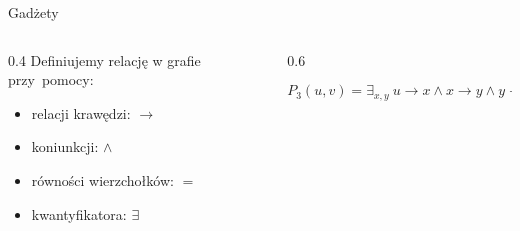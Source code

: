 \begin{frame}{Gadżety}
\begin{columns}
    \begin{column}{0.4\textwidth}
    Definiujemy relację w grafie przy~pomocy:
        \begin{itemize}
            \item relacji krawędzi: \(\to\)
            \item koniunkcji: \(\land\)
            \item równości wierzchołków: \(=\)
            \item kwantyfikatora: \(\exists\)
        \end{itemize}
    \end{column}
    \begin{column}{0.6\textwidth}
    \begin{figure}
        \centering
        
    \end{figure}
        \[P_3(u,v)=\exists_{x,y} \ u \to x \land x \to y \land y \to v\]
    \vspace{-2em}
    \vspace{-2em}
    \end{column}

\end{columns}
\end{frame}